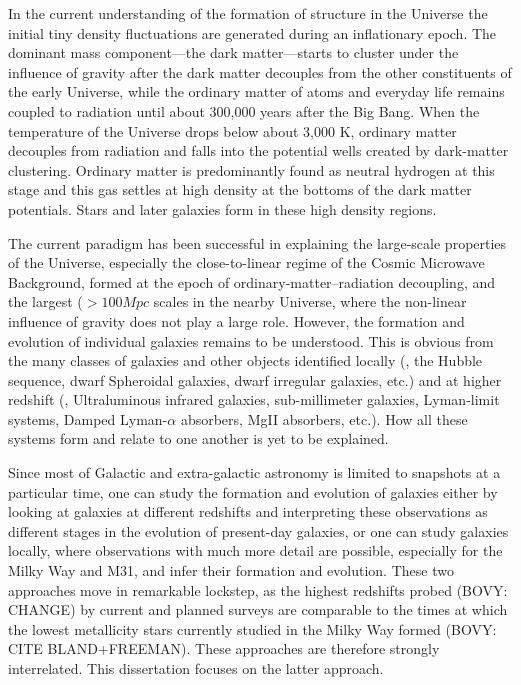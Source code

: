 In the current understanding of the formation of structure in the
Universe the initial tiny density fluctuations are generated during an
inflationary epoch. The dominant mass component---the dark
matter---starts to cluster under the influence of gravity after the
dark matter decouples from the other constituents of the early
Universe, while the ordinary matter of atoms and everyday life remains
coupled to radiation until about 300,000 years after the Big
Bang. When the temperature of the Universe drops below about 3,000 K,
ordinary matter decouples from radiation and falls into the potential
wells created by dark-matter clustering. Ordinary matter is
predominantly found as neutral hydrogen at this stage and this gas
settles at high density at the bottoms of the dark matter
potentials. Stars and later galaxies form in these high density regions.

The current paradigm has been successful in explaining the large-scale
properties of the Universe, especially the close-to-linear regime of
the Cosmic Microwave Background, formed at the epoch of
ordinary-matter--radiation decoupling, and the largest ($> 100 Mpc$
scales in the nearby Universe, where the non-linear influence of
gravity does not play a large role. However, the formation and
evolution of individual galaxies remains to be understood. This is
obvious from the many classes of galaxies and other objects identified
locally (\eg, the Hubble sequence, dwarf Spheroidal galaxies, dwarf
irregular galaxies, etc.) and at higher redshift (\eg, Ultraluminous
infrared galaxies, sub-millimeter galaxies, Lyman-limit systems,
Damped Lyman-$\alpha$ absorbers, MgII absorbers, etc.). How all these
systems form and relate to one another is yet to be explained. 

Since most of Galactic and extra-galactic astronomy is limited to
snapshots at a particular time, one can study the formation and
evolution of galaxies either by looking at galaxies at different
redshifts and interpreting these observations as different stages in
the evolution of present-day galaxies, or one can study galaxies
locally, where observations with much more detail are possible,
especially for the Milky Way and M31, and infer their formation and
evolution. These two approaches move in remarkable lockstep, as the
highest redshifts probed (BOVY: CHANGE) by current and planned surveys
are comparable to the times at which the lowest metallicity stars
currently studied in the Milky Way formed (BOVY: CITE
BLAND+FREEMAN). These approaches are therefore strongly
interrelated. This dissertation focuses on the latter approach.



